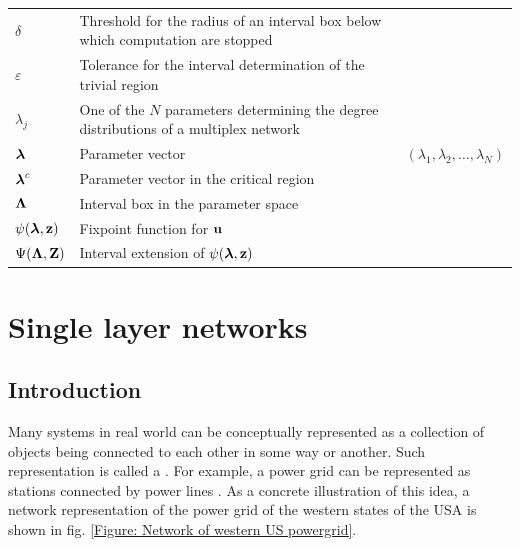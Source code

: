 \documentclass[
11pt, %
american, %
singlespacing, %
final, %
nolistspacing, %
liststotoc, %
headsepline, %
]{MastersDoctoralThesis} %
\begin{document}
{\begin{longtable}{m{}m{}m{}}
\addlinespace

$\delta$		& Threshold for the radius of an interval box below which computation are stopped \\
$\varepsilon$	& Tolerance for the interval determination of the trivial region \\
$\lambda_j$ 	& One of the $N$ parameters determining the degree distributions of a multiplex network \\
$\boldsymbol{\mathrm{\lambda}}$	& Parameter vector & $(\lambda_1, \lambda_2, \dots, \lambda_N)$ \\
$\boldsymbol{\mathrm{\lambda}}^c$	& Parameter vector in the critical region \\
$\boldsymbol{\mathrm{\Lambda}}$		& Interval box in the parameter space \\
$\psi(\boldsymbol{\mathrm{\lambda}}, \boldsymbol{\mathrm{z}})$	& Fixpoint function for $\boldsymbol{\mathrm{u}}$ \\
$\Psi(\boldsymbol{\mathrm{\Lambda}}, \boldsymbol{\mathrm{Z}})$			& Interval extension of $\psi(\boldsymbol{\mathrm{\lambda}}, \boldsymbol{\mathrm{z}})$ \\

\end{longtable}
}



\listoftodos

\mainmatter %

\pagestyle{thesis} %


\chapter{Single layer networks}
\label{Section: Single layer networks}

\section{Introduction}

Many systems in real world can be conceptually represented as a collection of objects being connected to each other in some way or another. Such representation is called a . For example, a power grid can be represented as stations connected by power lines \cite{watts1998collective}. As a concrete illustration of this idea, a network representation of the power grid of the western states of the USA is shown in fig. \ref{Figure: Network of western US powergrid}.
\end{document}
